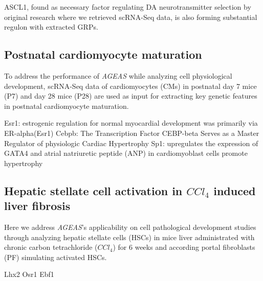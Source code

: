 \documentclass[fleqn,10pt]{wlscirep}
\begin{document}
  ASCL1, found as necessary factor regulating DA neurotransmitter selection by original research where we retrieved scRNA-Seq data\cite{ASCL1_dopaminergic_neuron_2021}, is also forming substantial regulon with extracted GRPs.


  \subsection*{Postnatal cardiomyocyte maturation}
  To address the performance of \emph{AGEAS} while analyzing cell physiological development, scRNA-Seq data of cardiomyocytes (CMs) in postnatal day 7 mice (P7) and day 28 mice (P28) are used as input for extracting key genetic features in postnatal cardiomyocyte maturation.

  Esr1: estrogenic regulation for normal myocardial development was primarily via ER-alpha(Esr1)
  Cebpb: The Transcription Factor CEBP-beta Serves as a Master Regulator of physiologic Cardiac Hypertrophy
  Sp1: upregulates the expression of GATA4 and atrial natriuretic peptide (ANP) in cardiomyoblast cells promote hypertrophy

  \subsection*{Hepatic stellate cell activation in $CCl_4$ induced liver fibrosis}
  Here we address \emph{AGEAS}'s applicability on cell pathological development studies through analyzing hepatic stellate cells (HSCs) in mice liver administrated with chronic carbon tetrachloride ($CCl_4$) for 6 weeks and according portal fibroblasts (PF) simulating activated HSCs.

  Lhx2
  Osr1
  Ebf1
\end{document}

